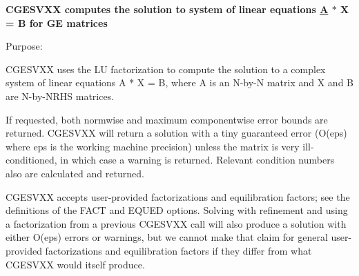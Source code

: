 {\bfseries  C\+G\+E\+S\+V\+X\+X computes the solution to system of linear equations \hyperlink{classA}{A} $\ast$ X = B for G\+E matrices} 

 \begin{DoxyParagraph}{Purpose\+: }
\begin{DoxyVerb}    CGESVXX uses the LU factorization to compute the solution to a
    complex system of linear equations  A * X = B,  where A is an
    N-by-N matrix and X and B are N-by-NRHS matrices.

    If requested, both normwise and maximum componentwise error bounds
    are returned. CGESVXX will return a solution with a tiny
    guaranteed error (O(eps) where eps is the working machine
    precision) unless the matrix is very ill-conditioned, in which
    case a warning is returned. Relevant condition numbers also are
    calculated and returned.

    CGESVXX accepts user-provided factorizations and equilibration
    factors; see the definitions of the FACT and EQUED options.
    Solving with refinement and using a factorization from a previous
    CGESVXX call will also produce a solution with either O(eps)
    errors or warnings, but we cannot make that claim for general
    user-provided factorizations and equilibration factors if they
    differ from what CGESVXX would itself produce.\end{DoxyVerb}
 
\end{DoxyParagraph}
